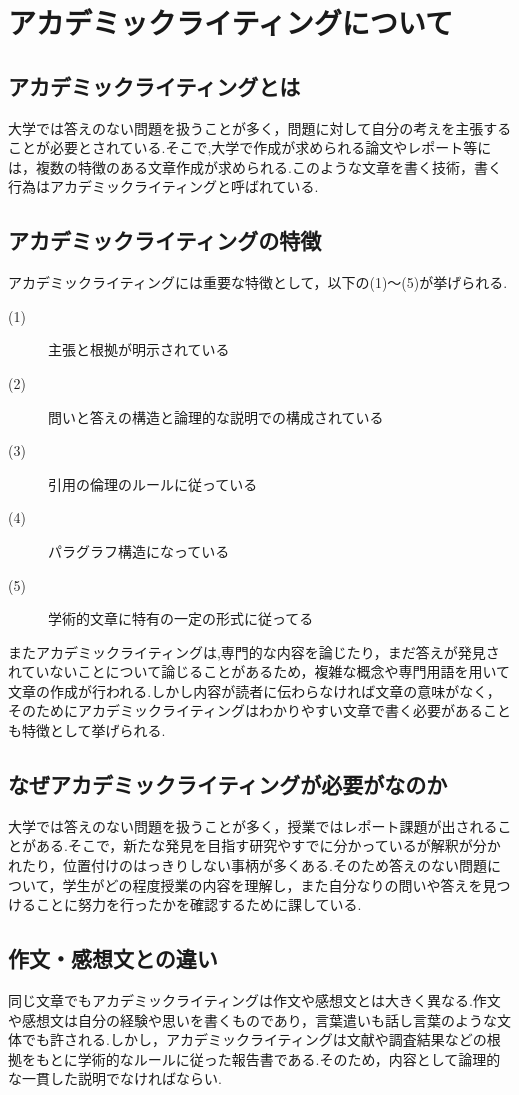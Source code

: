 \documentclass[a4j,12pt]{jarticle}
\begin{document}
\section{アカデミックライティングについて}
\subsection{アカデミックライティングとは}
大学では答えのない問題を扱うことが多く，問題に対して自分の考えを主張することが必要とされている.そこで,大学で作成が求められる論文やレポート等には，複数の特徴のある文章作成が求められる.このような文章を書く技術，書く行為はアカデミックライティングと呼ばれている\cite{ren2}.
\subsection{アカデミックライティングの特徴}
アカデミックライティングには重要な特徴として，以下の(1)〜(5)が挙げられる.
\begin{description}
  \item[(1)] 主張と根拠が明示されている
  \item[(2)] 問いと答えの構造と論理的な説明での構成されている
  \item[(3)] 引用の倫理のルールに従っている
  \item[(4)] パラグラフ構造になっている
  \item[(5)] 学術的文章に特有の一定の形式に従ってる
 \end{description}
 
 またアカデミックライティングは,専門的な内容を論じたり，まだ答えが発見されていないことについて論じることがあるため，複雑な概念や専門用語を用いて文章の作成が行われる.しかし内容が読者に伝わらなければ文章の意味がなく，そのためにアカデミックライティングはわかりやすい文章で書く必要があることも特徴として挙げられる\cite{ren7}.
 
\newpage
\subsection{なぜアカデミックライティングが必要がなのか}
大学では答えのない問題を扱うことが多く，授業ではレポート課題が出されることがある.そこで，新たな発見を目指す研究やすでに分かっているが解釈が分かれたり，位置付けのはっきりしない事柄が多くある.そのため答えのない問題について，学生がどの程度授業の内容を理解し，また自分なりの問いや答えを見つけることに努力を行ったかを確認するために課している.

\subsection{作文・感想文との違い}
同じ文章でもアカデミックライティングは作文や感想文とは大きく異なる.作文や感想文は自分の経験や思いを書くものであり，言葉遣いも話し言葉のような文体でも許される.しかし，アカデミックライティングは文献や調査結果などの根拠をもとに学術的なルールに従った報告書である.そのため，内容として論理的な一貫した説明でなければならい.
\end{document}

